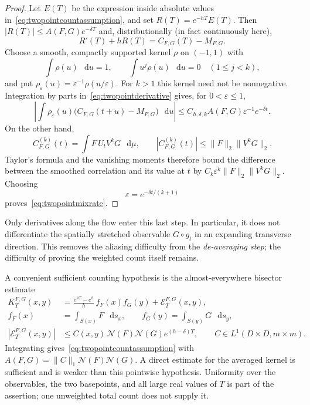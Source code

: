 \documentclass[11pt,a4paper]{article}
\numberwithin{equation}{section}
\theoremstyle{definition}
\theoremstyle{remark}
\newcommand{\dd}{\mathop{}\!\mathrm d}
\begin{document}
\begin{proof}
Let $E(T)$ be the expression inside absolute values
in~\eqref{eq:twopointcountassumption}, and set
$R(T)=e^{-hT}E(T)$. Then $|R(T)|\leq A(F,G)e^{-\delta T}$ and,
distributionally (in fact continuously here),
\begin{equation}
 R'(T)+hR(T)=C_{F,G}(T)-M_{F,G}.
 \label{eq:twopointderivative}
\end{equation}
Choose a smooth, compactly supported kernel $\rho$ on $(-1,1)$ with
\[
 \int\rho(u)\,\dd u=1,\qquad
 \int u^j\rho(u)\,\dd u=0\quad(1\leq j<k),
\]
and put $\rho_\varepsilon(u)=\varepsilon^{-1}\rho(u/\varepsilon)$.
For $k>1$ this kernel need not be nonnegative. Integration by parts
in~\eqref{eq:twopointderivative} gives, for $0<\varepsilon\leq1$,
\[
 \left|\int\rho_\varepsilon(u)
       \bigl(C_{F,G}(t+u)-M_{F,G}\bigr)\,\dd u\right|
 \leq C_{h,\delta,k}A(F,G)\varepsilon^{-1}e^{-\delta t}.
\]
On the other hand,
\[
 C_{F,G}^{(k)}(t)
   =\int F\,U_tV^kG\,\dd\mu,
 \qquad |C_{F,G}^{(k)}(t)|
   \leq\|F\|_2\|V^kG\|_2.
\]
Taylor's formula and the vanishing moments therefore bound the
difference between the smoothed correlation and its value at $t$
by $C_k\varepsilon^k\|F\|_2\|V^kG\|_2$. Choosing
\[
 \varepsilon=e^{-\delta t/(k+1)}
\]
proves~\eqref{eq:twopointmixrate}.
\end{proof}

Only derivatives along the flow enter this last step. In particular,
it does not differentiate the spatially stretched observable
$G\circ g_t$ in an expanding transverse direction. This removes the
aliasing difficulty from the \emph{de-averaging step}; the difficulty
of proving the weighted count itself remains.

A convenient sufficient counting hypothesis is the almost-everywhere
bisector estimate
\begin{equation}
 \begin{split}
 K_T^{F,G}(x,y)
  &=\frac{e^{hT}-e^h}{h}\,
      f_F(x)f_G(y)+\mathcal E_T^{F,G}(x,y),\\
 f_F(x)&=\int_{S(x)}F\,\dd s_x,\qquad
 f_G(y)=\int_{S(y)}G\,\dd s_y,\\
 |\mathcal E_T^{F,G}(x,y)|
  &\leq C(x,y)\,\mathcal N(F)\mathcal N(G)
          e^{(h-\delta)T},\qquad
 C\in L^1(D\times D,m\times m).
 \end{split}
 \label{eq:twopointpointwise}
\end{equation}
Integrating gives~\eqref{eq:twopointcountassumption} with
$A(F,G)=\|C\|_1\mathcal N(F)\mathcal N(G)$. A direct estimate
for the averaged kernel is sufficient and is weaker than this
pointwise hypothesis. Uniformity over the observables, the two
basepoints, and all large real values of $T$ is part of the assertion;
one unweighted total count does not supply it.
\end{document}
